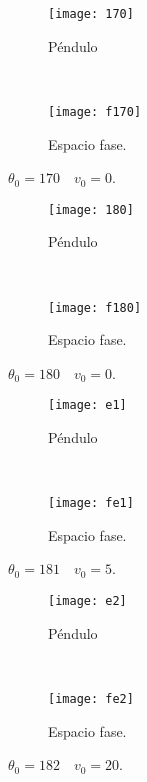\documentclass[12pt]{article}
\begin{document}
\begin{figure}[H]
    \centering
    \begin{subfigure}[b]{0.4\textwidth}
    \centering
        \texttt{[image: 170]}
        \caption{Péndulo}
    \end{subfigure}
    ~ 
    \begin{subfigure}[b]{0.4\textwidth}
    \centering
        \texttt{[image: f170]}
        \caption{Espacio fase.}
    \end{subfigure}
    \caption{$\theta_0=170 \quad v_0=0$.}
\end{figure}

\begin{figure}[H]
    \centering
    \begin{subfigure}[b]{0.4\textwidth}
    \centering
        \texttt{[image: 180]}
        \caption{Péndulo}
    \end{subfigure}
    ~ 
    \begin{subfigure}[b]{0.4\textwidth}
    \centering
        \texttt{[image: f180]}
        \caption{Espacio fase.}
    \end{subfigure}
    \caption{$\theta_0=180 \quad v_0=0$.}
\end{figure}

\begin{figure}[H]
    \centering
    \begin{subfigure}[b]{0.4\textwidth}
    \centering
        \texttt{[image: e1]}
        \caption{Péndulo}
    \end{subfigure}
    ~ 
    \begin{subfigure}[b]{0.4\textwidth}
    \centering
        \texttt{[image: fe1]}
        \caption{Espacio fase.}
    \end{subfigure}
    \caption{$\theta_0=181 \quad v_0=5$.}
\end{figure}

\begin{figure}[H]
    \centering
    \begin{subfigure}[b]{0.4\textwidth}
    \centering
        \texttt{[image: e2]}
        \caption{Péndulo}
    \end{subfigure}
    ~ 
    \begin{subfigure}[b]{0.4\textwidth}
    \centering
        \texttt{[image: fe2]}
        \caption{Espacio fase.}
    \end{subfigure}
    \caption{$\theta_0=182 \quad v_0=20$.}
\end{figure}
\end{document}
